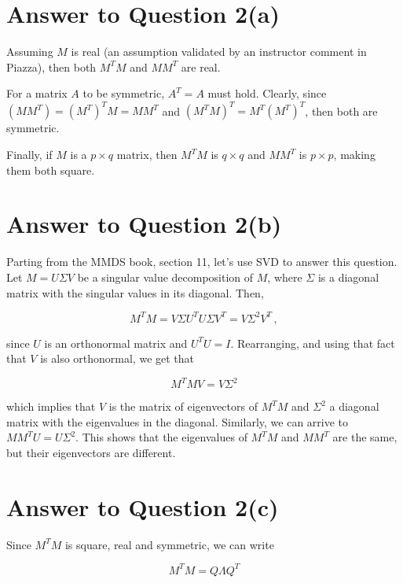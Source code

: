 \documentclass[11pt]{article}
\begin{document}
\pagebreak[4]
\section*{Answer to Question 2(a)}

Assuming $M$ is real (an assumption validated by an instructor comment in Piazza), then both $M^TM $ and $MM^T$ are real. 

For a matrix $A$ to be symmetric, $A^T = A$ must hold. Clearly, since $(MM^T) = (M^T)^TM = MM^T$ and $(M^TM)^T = M^T(M^T)^T$, then both are symmetric.

Finally, if $M$ is a $p \times q$ matrix, then $M^TM$ is $q \times q$ and $MM^T$ is $p \times p$, making them both square.

\pagebreak[4]
\section*{Answer to Question 2(b)}

Parting from the MMDS book, section 11, let's use SVD to answer this question. Let $M = U\Sigma V$ be a singular value decomposition of $M$, where $\Sigma$ is a diagonal matrix with the singular values in its diagonal. Then,

\begin{equation}
    M^TM = V \Sigma U^TU \Sigma V^T = V \Sigma^2 V^T \, ,
\end{equation}

since $U$ is an orthonormal matrix and $U^TU = I$. Rearranging, and using that fact that $V$ is also orthonormal, we get that

\begin{equation}
    M^TM V = V \Sigma^2
\end{equation}

which implies that $V$ is the matrix of eigenvectors of $M^TM$ and $\Sigma^2$ a diagonal matrix with the eigenvalues in the diagonal. Similarly, we can arrive to $MM^T U = U\Sigma^2$. This shows that the eigenvalues of $M^TM$ and $MM^T$ are the same, but their eigenvectors are different.

\pagebreak[4]
\section*{Answer to Question 2(c)}

Since $M^TM$ is square, real and symmetric, we can write 

\begin{equation}
    M^TM = Q \Lambda Q^T
\end{equation}
\end{document}
